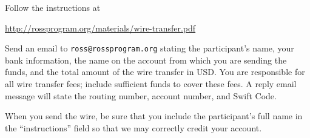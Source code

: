 \documentclass[11pt]{ross}
\begin{document}
Follow the instructions at
\begin{center}
\url{http://rossprogram.org/materials/wire-transfer.pdf}
\end{center}

Send an email to \texttt{ross@rossprogram.org} stating the
participant's name, your bank information, the name on the account
from which you are sending the funds, and the total amount of the wire
transfer in USD. You are responsible for all wire transfer fees;
include sufficient funds to cover these fees.  A reply email message
will state the routing number, account number, and Swift Code.

When you send the wire, be sure that you include the participant's
full name in the ``instructions'' field so that we may correctly
credit your account.
\end{document}
